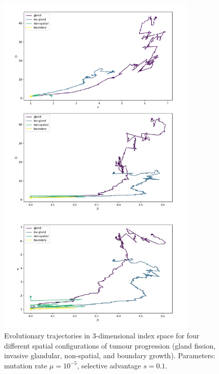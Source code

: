 \begin{figure}[h!]
    \centering
    \includegraphics[width=0.85\textwidth]{Chapter_3/figures/1e0501.pdf}
    \caption{Evolutionary trajectories in $3$-dimensional index space for four
    different spatial configurations of tumour progression (gland fission,
    invasive glandular, non-spatial, and boundary growth). Parameters: mutation
    rate $\mu = 10^{-5}$, selective advantage $s = 0.1$.}
    \label{fig:1e05_01}
\end{figure}

